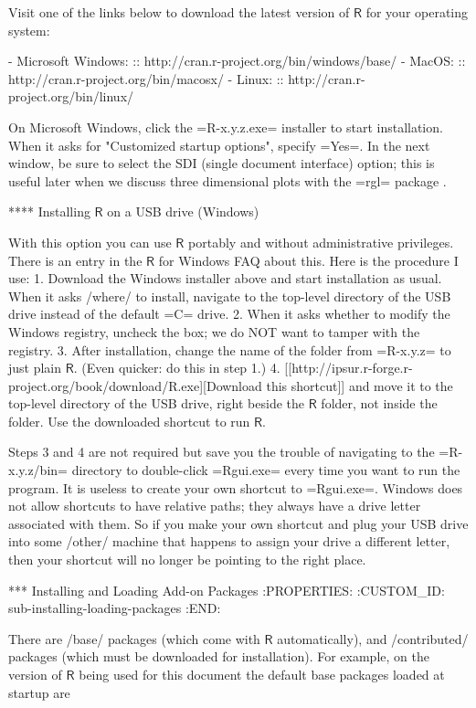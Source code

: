 Visit one of the links below to download the latest version of \(\mathsf{R}\) 
for your operating system:

- Microsoft Windows: :: http://cran.r-project.org/bin/windows/base/
- MacOS: :: http://cran.r-project.org/bin/macosx/
- Linux: :: http://cran.r-project.org/bin/linux/

On Microsoft Windows, click the =R-x.y.z.exe= installer to start
installation. When it asks for "Customized startup options", specify
=Yes=. In the next window, be sure to select the SDI (single document
interface) option; this is useful later when we discuss three
dimensional plots with the =rgl= package \cite{rgl}.

**** Installing \(\mathsf{R}\) on a USB drive (Windows)

With this option you can use \(\mathsf{R}\) portably and without
administrative privileges. There is an entry in the \(\mathsf{R}\) for
Windows FAQ about this. Here is the procedure I use:
1. Download the Windows installer above and start installation as
   usual. When it asks /where/ to install, navigate to the top-level
   directory of the USB drive instead of the default =C= drive.
2. When it asks whether to modify the Windows registry, uncheck the
   box; we do NOT want to tamper with the registry.
3. After installation, change the name of the folder from =R-x.y.z= to
   just plain \(\mathsf{R}\). (Even quicker: do this in step 1.)
4. [[http://ipsur.r-forge.r-project.org/book/download/R.exe][Download this shortcut]] and move it to the top-level directory of
   the USB drive, right beside the \(\mathsf{R}\) folder, not inside
   the folder. Use the downloaded shortcut to run \(\mathsf{R}\).

Steps 3 and 4 are not required but save you the trouble of navigating
to the =R-x.y.z/bin= directory to double-click =Rgui.exe= every time
you want to run the program. It is useless to create your own shortcut
to =Rgui.exe=. Windows does not allow shortcuts to have relative
paths; they always have a drive letter associated with them. So if you
make your own shortcut and plug your USB drive into some /other/
machine that happens to assign your drive a different letter, then
your shortcut will no longer be pointing to the right place.

*** Installing and Loading Add-on Packages
:PROPERTIES:
:CUSTOM_ID: sub-installing-loading-packages
:END:

There are /base/ packages (which come with \(\mathsf{R}\)
automatically), and /contributed/ packages (which must be downloaded
for installation). For example, on the version of \(\mathsf{R}\) being
used for this document the default base packages loaded at startup are

